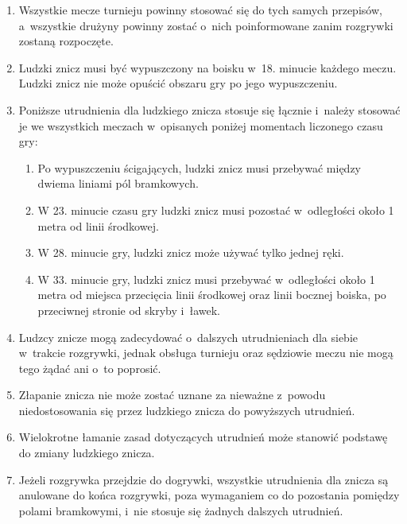 \documentclass[12pt,a4paper]{article}
\begin{document}
\begin{enumerate}
	\item Wszystkie mecze turnieju powinny stosować się do tych samych
	      przepisów, a~wszystkie drużyny powinny zostać o~nich poinformowane zanim
	      rozgrywki zostaną rozpoczęte.

	\item Ludzki znicz musi być wypuszczony na boisku w~18. minucie każdego
	      meczu. Ludzki znicz nie może opuścić obszaru gry po jego wypuszczeniu.

	\item Poniższe utrudnienia dla ludzkiego znicza stosuje się łącznie i~należy stosować je we wszystkich meczach w~opisanych poniżej momentach
	      liczonego czasu gry:
	      \begin{enumerate}
		      \item Po wypuszczeniu ścigających, ludzki znicz musi przebywać między
		            dwiema liniami pól bramkowych.

		      \item W 23. minucie czasu gry ludzki znicz musi pozostać w~odległości
		            około 1 metra od linii środkowej.

		      \item W 28. minucie gry, ludzki znicz może używać tylko jednej ręki.

		      \item W 33. minucie gry, ludzki znicz musi przebywać w~odległości około
		            1 metra od miejsca przecięcia linii środkowej oraz linii bocznej boiska,
		            po przeciwnej stronie od skryby i~ławek.
	      \end{enumerate}

	\item Ludzcy znicze mogą zadecydować o~dalszych utrudnieniach dla siebie w~trakcie rozgrywki, jednak obsługa turnieju oraz sędziowie meczu nie mogą
	      tego żądać ani o~to poprosić.

	\item Złapanie znicza nie może zostać uznane za nieważne z~powodu
	      niedostosowania się przez ludzkiego znicza do powyższych utrudnień.

	\item Wielokrotne łamanie zasad dotyczących utrudnień może stanowić
	      podstawę do zmiany ludzkiego znicza.

	\item Jeżeli rozgrywka przejdzie do dogrywki, wszystkie utrudnienia dla
	      znicza są anulowane do końca rozgrywki, poza wymaganiem co do pozostania
	      pomiędzy polami bramkowymi, i~nie stosuje się żadnych dalszych
	      utrudnień.
\end{enumerate}
\end{document}
